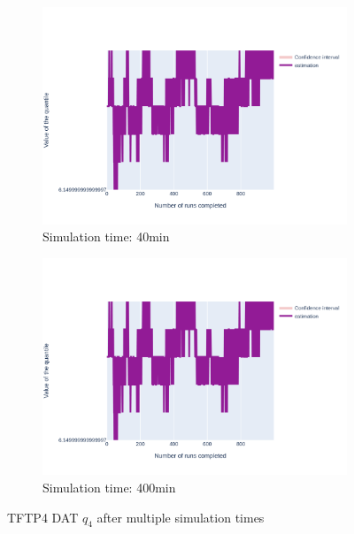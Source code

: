 \documentclass{article}
\begin{document}
\begin{figure}[H]
\begin{subfigure}{.495\textwidth}
    \end{subfigure}
    \begin{subfigure}{.495\textwidth}
        \centering
        \includegraphics[width=\textwidth]{../fig/quantile4/TFTP4 DAT_40mn.png}
        \caption{Simulation time: 40min}
    \end{subfigure}
    \begin{subfigure}{.495\textwidth}
        \centering
        \includegraphics[width=\textwidth]{../fig/quantile4/TFTP4 DAT_400mn.png}
        \caption{Simulation time: 400min}
    \end{subfigure}
    \caption{TFTP4 DAT $q_4$ after multiple simulation times}
\end{figure}
\end{document}
